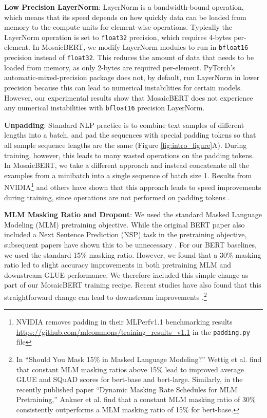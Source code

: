 \documentclass{article}
\begin{document}
\textbf{Low Precision LayerNorm}: LayerNorm is a bandwidth-bound operation, which means that its speed depends on how quickly data can be loaded from memory to the compute units for element-wise operations. Typically the LayerNorm operation is set to \texttt{float32} precision, which requires 4-bytes per-element. In MosaicBERT, we modify LayerNorm modules to run in \texttt{bfloat16} precision instead of \texttt{float32}.  This reduces the amount of data that needs to be loaded from memory, as only 2-bytes are required per-element. PyTorch's automatic-mixed-precision package does not, by default, run LayerNorm in lower precision because this can lead to numerical instabilities for certain models. However, our experimental results show that MosaicBERT does not experience any numerical instabilities with \texttt{bfloat16} precision LayerNorm.

\textbf{Unpadding}: Standard NLP practice is to combine text samples of different lengths into a batch, and pad the sequences with special padding tokens so that all sample sequence lengths are the same (Figure \ref{fig:intro_figure}A). During training, however, this leads to many wasted operations on the padding tokens. In MosaicBERT, we take a different approach and instead concatenate all the examples from a minibatch into a single sequence of batch size 1. Results from NVIDIA\footnote{NVIDIA removes padding in their MLPerfv1.1 benchmarking results \href{https://github.com/mlcommons/training_results_v1.1/blob/main/NVIDIA/benchmarks/bert/implementations/pytorch/padding.py}{\url{https://github.com/mlcommons/training\_results\_v1.1}} in the \texttt{padding.py} file} and others have shown that this approach leads to speed improvements during training, since operations are not performed on padding tokens  \citep{zeng2022boosting}. 

\textbf{MLM Masking Ratio and Dropout}:
We used the standard Masked Language Modeling (MLM) pretraining objective. While the original BERT paper also included a Next Sentence Prediction (NSP) task in the pretraining objective, subsequent papers have shown this to be unnecessary \citep{liu2019roberta,izsak2021train}. For our BERT baselines, we used the standard 15\% masking ratio. However, we found that a 30\% masking ratio led to slight accuracy improvements in both pretraining MLM and downstream GLUE performance. We therefore included this simple change as part of our MosaicBERT training recipe. Recent studies have also found that this straightforward change can lead to downstream improvements \citep{wettig2022should, ankner2023dynamic}.\footnote{In ``Should You Mask 15\% in Masked Language Modeling?'' Wettig et al. find that constant MLM masking ratios above 15\% lead to improved average GLUE and SQuAD scores for bert-base and bert-large. Similarly, in the recently published paper ``Dynamic Masking Rate Schedules for MLM Pretraining,'' Ankner et al. find that a constant MLM masking ratio of 30\% consistently outperforms a MLM masking ratio of 15\% for bert-base. }
\end{document}
